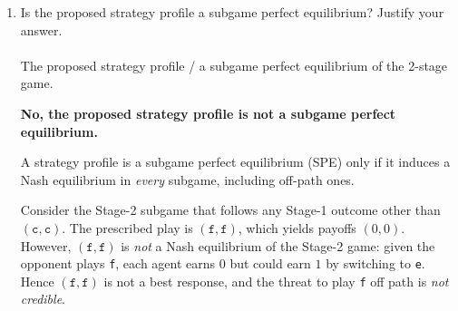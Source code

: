 \begin{enumerate}
\begin{solution}
\textbf{Yes, the proposed strategy profile is a Nash equilibrium.}

\medskip
\noindent We check whether either agent can profitably deviate given the other agent's strategy.

\medskip
\noindent \textit{On-path play:}  Under $(\texttt{c},\texttt{c})$ in Stage 1, the overall return for each agent is $(3+4)=7$.

\medskip
\noindent \textit{Can Agent 1 profitably deviate in Stage 1?}
If Agent 1 deviates to \texttt{d} while Agent 2 plays \texttt{c}, the Stage-1 outcome is $(\texttt{d},\texttt{c})$.  The strategy profile then prescribes $(\texttt{f},\texttt{f})$ in Stage 2.  Agent 1's total return is $4 + 0 = 4 < 7$.  No profitable deviation.

\medskip
\noindent \textit{Can Agent 2 profitably deviate in Stage 1?}  By symmetry, Agent 2's deviation to \texttt{d} yields $4 + 0 = 4 < 7$.  No profitable deviation.

\medskip
\noindent \textit{Stage-2 deviations:}  On path (after $(\texttt{c},\texttt{c})$), both agents play \texttt{e}. Given the other plays \texttt{e}, switching to \texttt{f} yields $0$ instead of $4$. No profitable deviation. Off path, both play \texttt{f}; given the other plays \texttt{f}, switching to \texttt{e} yields $1$ instead of $0$---but this off-path subgame is never reached under the proposed profile, so it does not violate the NE condition.

\medskip
\noindent Since no agent can improve their payoff by deviating, the profile is a Nash equilibrium.
\end{solution}

\item \points[3] Is the proposed strategy profile a subgame perfect equilibrium? Justify your answer.
\\~\\
The proposed strategy profile \raisebox{1.75mm}{\choice[is]} / \raisebox{1.75mm}{\choice[is not]}a subgame perfect equilibrium of the 2-stage game.

\begin{solution}
\textbf{No, the proposed strategy profile is not a subgame perfect equilibrium.}

\medskip
\noindent A strategy profile is a subgame perfect equilibrium (SPE) only if it induces a Nash equilibrium in \emph{every} subgame, including off-path ones.

\medskip
\noindent Consider the Stage-2 subgame that follows any Stage-1 outcome other than $(\texttt{c},\texttt{c})$.  The prescribed play is $(\texttt{f},\texttt{f})$, which yields payoffs $(0,0)$.  However, $(\texttt{f},\texttt{f})$ is \emph{not} a Nash equilibrium of the Stage-2 game: given the opponent plays \texttt{f}, each agent earns $0$ but could earn $1$ by switching to \texttt{e}.  Hence $(\texttt{f},\texttt{f})$ is not a best response, and the threat to play \texttt{f} off path is \emph{not credible}.


\end{solution}
\end{enumerate}
